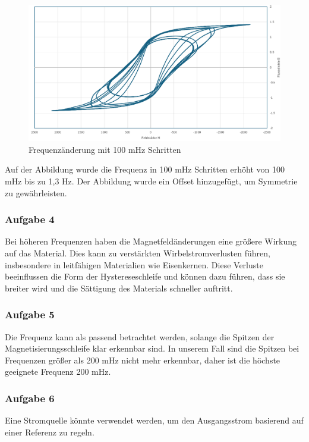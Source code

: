 \documentclass[a4paper,twoside,12pt,DIV=13,BCOR=5mm,numbers=noenddot,cleardoublepage=empty]{scrbook}
\begin{document}
            \begin{figure}[h] 
            \centering
            \includegraphics[width=\textwidth]{pictures/freqAnderung.png} 
            \caption{Frequenzänderung mit 100 mHz Schritten}
            \label{fig:meinbild}
            \end{figure}

            Auf der Abbildung wurde die Frequenz in 100 mHz Schritten erhöht von 100 mHz bis zu 1,3 Hz.
            Der Abbildung wurde ein Offset hinzugefügt, um Symmetrie zu gewährleisten.
            

            \subsubsection{Aufgabe 4}
            Bei höheren Frequenzen haben die Magnetfeldänderungen eine größere Wirkung auf das Material. Dies kann zu verstärkten Wirbelstromverlusten führen, insbesondere in leitfähigen Materialien wie Eisenkernen. Diese Verluste beeinflussen die Form der Hystereseschleife und können dazu führen, dass sie breiter wird und die Sättigung des Materials schneller auftritt.

            

            \subsubsection{Aufgabe 5} Die Frequenz kann als passend betrachtet werden, solange die Spitzen der Magnetisierungsschleife klar erkennbar sind. In unserem Fall sind die Spitzen bei Frequenzen größer als 200 mHz nicht mehr erkennbar, daher ist die höchste geeignete Frequenz 200 mHz.

            

            \subsubsection{Aufgabe 6} Eine Stromquelle könnte verwendet werden, um den Ausgangsstrom basierend auf einer Referenz zu regeln.             
            
\end{document}
